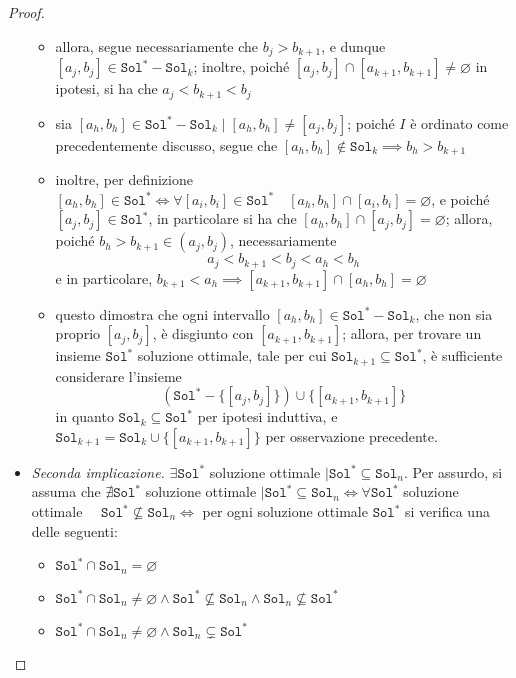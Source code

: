 \documentclass[14pt]{extreport}
\theoremstyle{definition}
\theoremstyle{definition}
\begin{document}
\begin{proof}
\begin{itemize}
\begin{itemize}
                \item allora, segue necessariamente che $b_j > b_{k + 1}$, e dunque $[a_j, b_j] \in \texttt{Sol}^* - \texttt{Sol}_k$; inoltre, poiché $[a_j, b_j] \cap [a_{k +1} , b_{k +1}] \neq \varnothing$ in ipotesi, si ha che $a_j < b_{k +1} < b_j$
                \item sia $[a_h, b_h] \in \texttt{Sol}^* - \texttt{Sol}_k \mid [a_h, b_h] \neq [a_j, b_j]$; poiché $I$ è ordinato come precedentemente discusso, segue che $[a_h, b_h] \notin \texttt{Sol}_k \implies b_h > b_{k +1}$
                \item inoltre, per definizione $[a_h, b_h] \in \texttt{Sol}^* \iff \forall [a_i, b_i] \in \texttt{Sol}^* \quad [a_h, b_h] \cap [a_i, b_i] = \varnothing$, e poiché $[a_j,b_j] \in \texttt{Sol}^*$, in particolare si ha che $[a_h, b_h] \cap [a_j, b_j] = \varnothing$; allora, poiché $b_h > b_{k + 1} \in (a_j, b_j)$, necessariamente $$a_j < b_{k +1} < b_j < a_h < b_h$$ e in particolare, $b_{k + 1} < a_h \implies [a_{k +1}, b_{k +1}] \cap [a_h, b_h] = \varnothing$
                \item questo dimostra che ogni intervallo $[a_h, b_h] \in \texttt{Sol}^* - \texttt{Sol}_k$, che non sia proprio $[a_j, b_j]$, è disgiunto con $[a_{k +1}, b_{k +1}]$; allora, per trovare un insieme $\texttt{Sol}^*$ soluzione ottimale, tale per cui $\texttt{Sol}_{k + 1} \subseteq \texttt{Sol}^*$, è sufficiente considerare l'insieme $$\left(\texttt{Sol}^* - \{[a_j, b_j]\}\right) \cup \{[a_{k +1}, b_{k +1}]\}$$ in quanto $\texttt{Sol}_k \subseteq \texttt{Sol}^*$ per ipotesi induttiva, e $\texttt{Sol}_{k + 1} = \texttt{Sol}_k \cup \{[a_{k +1}, b_{k + 1}]\}$ per osservazione precedente.
            \end{itemize}
            \item[] \textit{Seconda implicazione.} $\exists \texttt{Sol}^*$ soluzione ottimale $\mid \texttt{Sol}^* \subseteq \texttt{Sol}_n$. Per assurdo, si assuma che $\nexists \texttt{Sol}^*$ soluzione ottimale $\mid \texttt{Sol}^* \subseteq \texttt{Sol}_n \iff \forall \texttt{Sol}^*$ soluzione ottimale $\quad \texttt{Sol}^* \not \subseteq \texttt{Sol}_n \iff$ per ogni soluzione ottimale $\texttt{Sol}^*$ si verifica una delle seguenti:
            \begin{itemize}
                \item $\texttt{Sol}^* \cap \texttt{Sol}_n = \varnothing$
                \item $\texttt{Sol}^* \cap \texttt{Sol}_n \neq \varnothing \land \texttt{Sol}^* \not \subseteq \texttt{Sol}_n \land \texttt{Sol}_n \not \subseteq \texttt{Sol}^*$
                \item $\texttt{Sol}^* \cap \texttt{Sol}_n \neq \varnothing \land \texttt{Sol}_n \subsetneq \texttt{Sol}^*$
            \end{itemize}


\end{itemize}
\end{proof}
\end{document}
